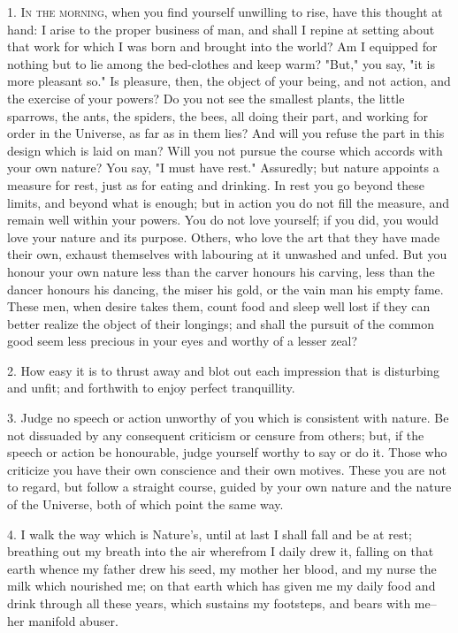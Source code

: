 \documentclass{book}
\begin{document}
1. \textsc{In the morning,} when you find yourself unwilling to rise,
have this thought at hand: I arise to the proper business of man, and
shall I repine at setting about that work for which I was born and
brought into the world? Am I equipped for nothing but to lie among the
bed-clothes and keep warm? "But," you say, "it is more pleasant so."
Is pleasure, then, the object of your being, and not action, and the
exercise of your powers? Do you not see the smallest plants, the little
sparrows, the ants, the spiders, the bees, all doing their part, and
working for order in the Universe, as far as in them lies? And will you
refuse the part in this design which is laid on man? Will you not pursue
the course which accords with your own nature? You say, "I must have
rest." Assuredly; but nature appoints a measure for rest, just as for
eating and drinking. In rest you go beyond these limits, and beyond what
is enough; but in action you do not fill the measure, and remain well
within your powers. You do not love yourself; if you did, you would love
your nature and its purpose. Others, who love the art that they have
made their own, exhaust themselves with labouring at it unwashed and
unfed. But you honour your own nature less than the carver honours his
carving, less than the dancer honours his dancing, the miser his gold,
or the vain man his empty fame. These men, when desire takes them, count
food and sleep well lost if they can better realize the object of their
longings; and shall the pursuit of the common good seem less precious in
your eyes and worthy of a lesser zeal?

2. How easy it is to thrust away and blot out each impression that is
disturbing and unfit; and forthwith to enjoy perfect tranquillity.

3. Judge no speech or action unworthy of you which is consistent with
nature. Be not dissuaded by any consequent criticism or censure from
others; but, if the speech or action be honourable, judge yourself
worthy to say or do it. Those who criticize you have their own
conscience and their own motives. These you are not to regard, but
follow a straight course, guided by your own nature and the nature of
the Universe, both of which point the same way.

4. I walk the way which is Nature's, until at last I shall fall and be
at rest; breathing out my breath into the air wherefrom I daily drew
it, falling on that earth whence my father drew his seed, my mother
her blood, and my nurse the milk which nourished me; on that earth
which has given me my daily food and drink through all these years,
which sustains my footsteps, and bears with me--her manifold abuser.
\end{document}
